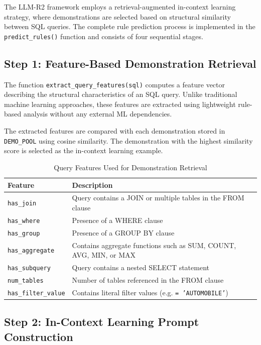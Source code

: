\documentclass[12pt,a4paper]{article}
\begin{document}
The LLM-R2 framework employs a retrieval-augmented in-context learning strategy, where demonstrations are selected based on structural similarity between SQL queries. The complete rule prediction process is implemented in the \texttt{predict\_rules()} function and consists of four sequential stages.

\subsection{Step 1: Feature-Based Demonstration Retrieval}

The function \texttt{extract\_query\_features(sql)} computes a feature vector describing the structural characteristics of an SQL query. Unlike traditional machine learning approaches, these features are extracted using lightweight rule-based analysis without any external ML dependencies.

The extracted features are compared with each demonstration stored in \texttt{DEMO\_POOL} using cosine similarity. The demonstration with the highest similarity score is selected as the in-context learning example.

\begin{table}[h]
\centering
\caption{Query Features Used for Demonstration Retrieval}
\label{tab:query_features}
\begin{tabular}{|l|p{8cm}|}
\hline
\textbf{Feature} & \textbf{Description} \\
\hline
\texttt{has\_join} & Query contains a JOIN or multiple tables in the FROM clause \\
\hline
\texttt{has\_where} & Presence of a WHERE clause \\
\hline
\texttt{has\_group} & Presence of a GROUP BY clause \\
\hline
\texttt{has\_aggregate} & Contains aggregate functions such as SUM, COUNT, AVG, MIN, or MAX \\
\hline
\texttt{has\_subquery} & Query contains a nested SELECT statement \\
\hline
\texttt{num\_tables} & Number of tables referenced in the FROM clause \\
\hline
\texttt{has\_filter\_value} & Contains literal filter values (e.g. \texttt{= 'AUTOMOBILE'}) \\
\hline
\end{tabular}
\end{table}



\subsection{Step 2: In-Context Learning Prompt Construction}
\end{document}
